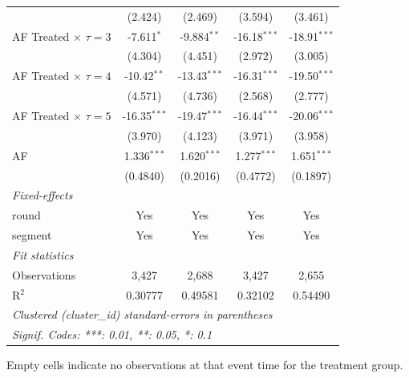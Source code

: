 \begin{tabular}{lcccc}
                                     & (2.424)        & (2.469)        & (3.594)        & (3.461)\\   
   AF Treated $\times$ $\tau = 3$    & -7.611$^{*}$   & -9.884$^{**}$  & -16.18$^{***}$ & -18.91$^{***}$\\   
                                     & (4.304)        & (4.451)        & (2.972)        & (3.005)\\   
   AF Treated $\times$ $\tau = 4$    & -10.42$^{**}$  & -13.43$^{***}$ & -16.31$^{***}$ & -19.50$^{***}$\\   
                                     & (4.571)        & (4.736)        & (2.568)        & (2.777)\\   
   AF Treated $\times$ $\tau = 5$    & -16.35$^{***}$ & -19.47$^{***}$ & -16.44$^{***}$ & -20.06$^{***}$\\   
                                     & (3.970)        & (4.123)        & (3.971)        & (3.958)\\   
   AF                                & 1.336$^{***}$  & 1.620$^{***}$  & 1.277$^{***}$  & 1.651$^{***}$\\   
                                     & (0.4840)       & (0.2016)       & (0.4772)       & (0.1897)\\   
   \midrule
   \emph{Fixed-effects}\\
   round                             & Yes            & Yes            & Yes            & Yes\\  
   segment                           & Yes            & Yes            & Yes            & Yes\\  
   \midrule
   \emph{Fit statistics}\\
   Observations                      & 3,427          & 2,688          & 3,427          & 2,655\\  
   R$^2$                             & 0.30777        & 0.49581        & 0.32102        & 0.54490\\  
   \midrule \midrule
   \multicolumn{5}{l}{\emph{Clustered (cluster\_id) standard-errors in parentheses}}\\
   \multicolumn{5}{l}{\emph{Signif. Codes: ***: 0.01, **: 0.05, *: 0.1}}\\
\end{tabular}
 
\par \raggedright 
Empty cells indicate no observations at that event time for the treatment group.
\par\endgroup



